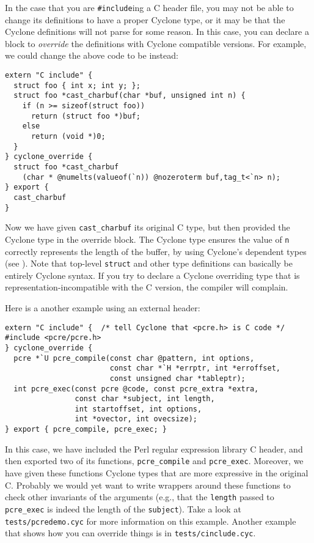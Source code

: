 In the case that you are \texttt{\#include}ing a C header file, you
may not be able to change its definitions to have a proper Cyclone
type, or it may be that the Cyclone definitions will not parse for
some reason.  In this case, you can declare a block to \emph{override}
the definitions with Cyclone compatible versions.  For example, we
could change the above code to be instead:
\begin{verbatim}
extern "C include" {
  struct foo { int x; int y; };
  struct foo *cast_charbuf(char *buf, unsigned int n) {
    if (n >= sizeof(struct foo))
      return (struct foo *)buf;
    else
      return (void *)0;
  }
} cyclone_override {
  struct foo *cast_charbuf
    (char * @numelts(valueof(`n)) @nozeroterm buf,tag_t<`n> n);
} export {
  cast_charbuf
}
\end{verbatim}
Now we have given \texttt{cast_charbuf} its original C type, but then
provided the Cyclone type in the override block.  The Cyclone type
ensures the value of \texttt{n} correctly represents the length of the
buffer, by using Cyclone's dependent types (see
).  Note that top-level \texttt{struct} and
other type definitions can basically be entirely Cyclone syntax.  If
you try to declare a Cyclone overriding type that is
representation-incompatible with the C version, the compiler will
complain.

Here is a another example using an external header:
\begin{verbatim}
extern "C include" {  /* tell Cyclone that <pcre.h> is C code */
#include <pcre/pcre.h>
} cyclone_override {
  pcre *`U pcre_compile(const char @pattern, int options,
                        const char *`H *errptr, int *erroffset,
                        const unsigned char *tableptr);
  int pcre_exec(const pcre @code, const pcre_extra *extra, 
                const char *subject, int length,
                int startoffset, int options,
                int *ovector, int ovecsize);
} export { pcre_compile, pcre_exec; }
\end{verbatim}
In this case, we have included the Perl regular expression library C
header, and then exported two of its functions, \texttt{pcre_compile}
and \texttt{pcre_exec}.  Moreover, we have given these functions
Cyclone types that are more expressive in the original C.  Probably we
would yet want to write wrappers around these functions to check other
invariants of the arguments (e.g., that the \texttt{length} passed to
\texttt{pcre_exec} is indeed the length of the \texttt{subject}).
Take a look at \texttt{tests/pcredemo.cyc} for more information on
this example.  Another example that shows how you can override things
is in \texttt{tests/cinclude.cyc}.

